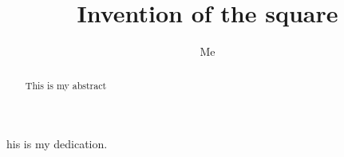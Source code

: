 \documentclass[12pt]{report}
\begin{document}
%
%
%

  \author{Me}
  \title{Invention of the square}
\maketitle


\begin{abstract}This is my abstract
\end{abstract}

%
%

%
%
%
\dedication
This is my dedication.
\end{document}
